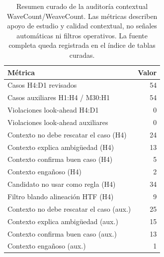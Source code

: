 \begin{table}[H]
\centering
\scriptsize
\begin{tabular}{lr}
\hline
M\'etrica & Valor \\
\hline
Casos H4:D1 revisados & 54 \\
Casos auxiliares H1:H4 / M30:H1 & 54 \\
Violaciones look-ahead H4:D1 & 0 \\
Violaciones look-ahead auxiliares & 0 \\
Contexto no debe rescatar el caso (H4) & 24 \\
Contexto explica ambig\"uedad (H4) & 13 \\
Contexto confirma buen caso (H4) & 5 \\
Contexto enga\~noso (H4) & 2 \\
Candidato no usar como regla (H4) & 34 \\
Filtro blando alineaci\'on HTF (H4) & 9 \\
Contexto no debe rescatar el caso (aux.) & 25 \\
Contexto explica ambig\"uedad (aux.) & 15 \\
Contexto confirma buen caso (aux.) & 13 \\
Contexto enga\~noso (aux.) & 1 \\
\hline
\end{tabular}
\caption[Auditor\'ia contextual WaveCount/WeaveCount]{Resumen curado de la auditor\'ia contextual WaveCount/WeaveCount. Las m\'etricas describen apoyo de estudio y calidad contextual, no se\~nales autom\'aticas ni filtros operativos. La fuente completa queda registrada en el \'indice de tablas curadas.}
\label{tab:wavecount-contexto}
\end{table}
